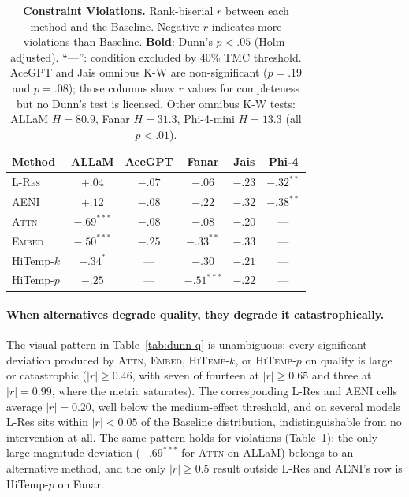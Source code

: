 \documentclass[11pt]{article}
\begin{document}
\begin{table}[h]
\centering
\small
\setlength{\tabcolsep}{4pt}
\renewcommand{\arraystretch}{1.15}
\caption{%
\textbf{Constraint Violations.} Rank-biserial $r$ between each method
and the Baseline. Negative $r$ indicates more violations than
Baseline. \textbf{Bold}: Dunn's $p\!<\!.05$ (Holm-adjusted).
``---'': condition excluded by 40\% TMC threshold. AceGPT and Jais
omnibus K-W are non-significant ($p\!=\!.19$ and $p\!=\!.08$); those
columns show $r$ values for completeness but no Dunn's test is
licensed. Other omnibus K-W tests: ALLaM $H\!=\!80.9$, Fanar
$H\!=\!31.3$, Phi-4-mini $H\!=\!13.3$ (all $p\!<\!.01$).}
\label{tab:dunn-v}
\begin{tabular}{l c c c c c}
\toprule
\textbf{Method} & ALLaM & AceGPT & Fanar & Jais & Phi-4 \\
\midrule
\textsc{L-Res} & $+.04$ & $-.07$ & $-.06$ & $-.23$ & $\mathbf{-.32^{**}}$ \\
\textsc{AENI}  & $+.12$ & $-.08$ & $-.22$ & $-.32$ & $\mathbf{-.38^{**}}$ \\
\midrule
\textsc{Attn}  & $\mathbf{-.69^{***}}$ & $-.08$ & $-.08$               & $-.20$ & --- \\
\textsc{Embed} & $\mathbf{-.50^{***}}$ & $-.25$ & $\mathbf{-.33^{**}}$ & $-.33$ & --- \\
HiTemp-$k$     & $\mathbf{-.34^{*}}$   & ---    & $-.30$               & $-.21$ & --- \\
HiTemp-$p$     & $-.25$                & ---    & $\mathbf{-.51^{***}}$& $-.22$ & --- \\
\bottomrule
\end{tabular}
\end{table}

\paragraph{When alternatives degrade quality, they degrade it catastrophically.} The visual pattern in Table~\ref{tab:dunn-q} is unambiguous: every significant deviation produced by \textsc{Attn}, \textsc{Embed}, \textsc{HiTemp-$k$}, or \textsc{HiTemp-$p$} on quality is large or catastrophic ($|r| \geq 0.46$, with seven of fourteen at $|r| \geq 0.65$ and three at $|r| = 0.99$, where the metric saturates). The corresponding L-Res and AENI cells average $|r| = 0.20$, well below the medium-effect threshold, and on several models L-Res sits within $|r| < 0.05$ of the Baseline distribution, indistinguishable from no intervention at all. The same pattern holds for violations (Table~\ref{tab:dunn-v}): the only large-magnitude deviation ($\mathbf{-.69^{***}}$ for \textsc{Attn} on ALLaM) belongs to an alternative method, and the only $|r| \geq 0.5$ result outside L-Res and AENI's row is HiTemp-$p$ on Fanar.
\end{document}
